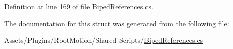 Definition at line 169 of file Biped\+References.\+cs.



The documentation for this struct was generated from the following file\+:\begin{DoxyCompactItemize}
\item 
Assets/\+Plugins/\+Root\+Motion/\+Shared Scripts/\mbox{\hyperlink{_biped_references_8cs}{Biped\+References.\+cs}}\end{DoxyCompactItemize}
